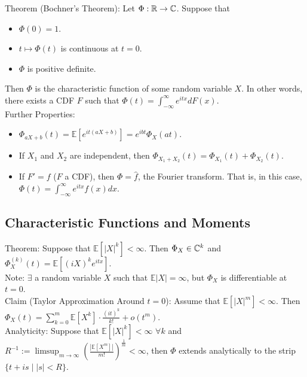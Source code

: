 \documentclass[english, 11pt]{article}
\begin{document}
Theorem (Bochner's Theorem):
Let $\Phi: {\mathbb{R}} \to {\mathbb{C}}$. Suppose that

\begin{itemize}
	\item $\Phi(0) = 1$.
	\item $t \mapsto \Phi(t)$ is continuous at $t = 0$.
	\item $\Phi$ is positive definite.
\end{itemize}

Then $\Phi$ is the characteristic function of some random variable $X$. In other words, there exists a CDF $F$ such that $\Phi(t) = \int_{-\infty}^\infty e^{itx}dF(x)$.\\

Further Properties:

\begin{itemize}
	\item $\Phi_{aX + b}(t) = \mathbb{E}[e^{it(aX + b)}] = e^{ibt} \Phi_X(at)$.
	\item If $X_1$ and $X_2$ are independent, then $\Phi_{X_1 + X_2}(t) = \Phi_{X_1}(t) + \Phi_{X_2}(t)$.
	\item If $F' = f$ ($F$ a CDF), then $\Phi = \hat{f}$, the Fourier transform. That is, in this case, $\Phi(t) = \int_{-\infty}^\infty e^{itx}f(x)dx$. 
\end{itemize}

\subsection{Characteristic Functions and Moments}

Theorem: Suppose that $\mathbb{E}[|X|^k] < \infty$. Then $\Phi_X \in {\mathbb{C}}^k$ and $\Phi_X^{(k)}(t) = \mathbb{E}[(iX)^k e^{itx}]$.\\

Note: $\exists$ a random variable $X$ such that $\mathbb{E} |X| = \infty$, but $\Phi_X$ is differentiable at $t = 0$.\\

Claim (Taylor Approximation Around $t=0$): Assume that $\mathbb{E}[|X|^m] < \infty$. Then $\Phi_X(t) = \sum_{k = 0}^m \mathbb{E}[X^k] \cdot \frac{(it)^k}{k!} + o(t^m)$.\\

Analyticity: Suppose that $\mathbb{E}[|X|^k] < \infty$ $\forall k$ and $R^{-1} := \limsup_{m \to \infty}(\frac{|\mathbb{E}[X^m]|}{m!})^\frac{1}{m} < \infty$, then $\Phi$ extends analytically to the strip $\{t + is \mid |s| < R\}$.\\
\end{document}
